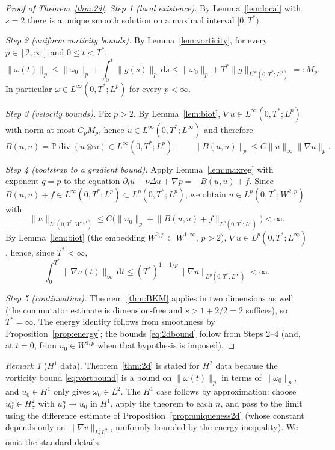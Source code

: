 \documentclass[11pt]{article}
\theoremstyle{remark}
\newtheorem{remark}[theorem]{Remark}
\newcommand{\dd}{\,\mathrm{d}}
\newcommand{\norm}[1]{\lVert #1\rVert}
\newcommand{\Div}{\operatorname{div}}
\newcommand{\Leray}{\mathbb{P}}
\begin{document}
\begin{proof}[Proof of Theorem~\ref{thm:2d}]
\emph{Step 1 (local existence).} By Lemma~\ref{lem:local} with $s=2$ there is a unique smooth
solution on a maximal interval $[0,T^*)$.

\emph{Step 2 (uniform vorticity bounds).} By Lemma~\ref{lem:vorticity}, for every
$p\in[2,\infty]$ and $0\le t<T^*$,
\[
\norm{\omega(t)}_{p}\le\norm{\omega_0}_{p}+\int_0^{t}\norm{g(s)}_{p}\dd s
\le\norm{\omega_0}_{p}+T^*\norm{g}_{L^\infty(0,T^*;L^p)}=:M_p .
\]
In particular $\omega\in L^\infty(0,T^*;L^p)$ for every $p<\infty$.

\emph{Step 3 (velocity bounds).} Fix $p>2$. By Lemma~\ref{lem:biot},
$\nabla u\in L^\infty(0,T^*;L^p)$ with norm at most $C_pM_p$, hence
$u\in L^\infty(0,T^*;L^\infty)$ and therefore
\[
B(u,u)=\Leray\Div(u\otimes u)\in L^\infty(0,T^*;L^p),
\qquad
\norm{B(u,u)}_{p}\le C\norm{u}_{\infty}\norm{\nabla u}_{p}.
\]

\emph{Step 4 (bootstrap to a gradient bound).} Apply Lemma~\ref{lem:maxreg} with exponent
$q=p$ to the equation $\partial_tu-\nu\Delta u+\nabla p=-B(u,u)+f$. Since
$B(u,u)+f\in L^\infty(0,T^*;L^p)\subset L^p(0,T^*;L^p)$, we obtain
$u\in L^p(0,T^*;W^{2,p})$ with
\[
\norm{u}_{L^p(0,T^*;W^{2,p})}\le C\bigl(\norm{u_0}_{p}+\norm{B(u,u)+f}_{L^p(0,T^*;L^p)}\bigr)<\infty .
\]
By Lemma~\ref{lem:biot} (the embedding $W^{2,p}\subset W^{1,\infty}$, $p>2$),
$\nabla u\in L^p(0,T^*;L^\infty)$, hence, since $T^*<\infty$,
\[
\int_0^{T^*}\norm{\nabla u(t)}_{\infty}\dd t\le (T^*)^{1-1/p}\norm{\nabla u}_{L^p(0,T^*;L^\infty)}<\infty .
\]

\emph{Step 5 (continuation).} Theorem~\ref{thm:BKM} applies in two dimensions as well (the
commutator estimate is dimension-free and $s>1+2/2=2$ suffices), so $T^*=\infty$. The energy
identity follows from smoothness by Proposition~\ref{prop:energy}; the bounds
\eqref{eq:2dbound} follow from Steps 2--4 (and, at $t=0$, from $u_0\in W^{1,p}$ when that
hypothesis is imposed).
\end{proof}

\begin{remark}[$H^1$ data]\label{rem:2dH1}
Theorem~\ref{thm:2d} is stated for $H^2$ data because the vorticity bound
\eqref{eq:vortbound} is a bound on $\norm{\omega(t)}_p$ in terms of $\norm{\omega_0}_p$, and
$u_0\in H^1$ only gives $\omega_0\in L^2$. The $H^1$ case follows by approximation: choose
$u_0^n\in H^2_\sigma$ with $u_0^n\to u_0$ in $H^1$, apply the theorem to each $n$, and pass to
the limit using the difference estimate of Proposition~\ref{prop:uniqueness2d} (whose
constant depends only on $\norm{\nabla v}_{L^2_tL^2}$, uniformly bounded by the energy
inequality). We omit the standard details.
\end{remark}
\end{document}
